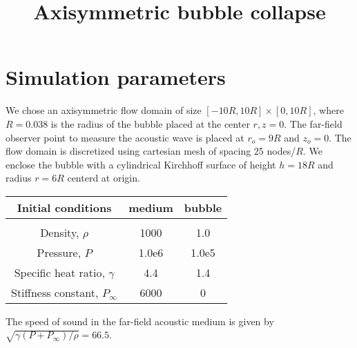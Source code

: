 \documentclass[a4paper]{article}
\title{Axisymmetric bubble collapse}
\date{}
\begin{document}
\maketitle
\section*{Simulation parameters}
We chose an axisymmetric flow domain of size $[-10R, 10R]\times[0, 10R]$, where $R = 0.038$ is the radius of the bubble placed at the center $r,z = 0$. The far-field observer point to measure the acoustic wave is placed at $r_o = 9R$ and $z_o = 0$. The flow domain is discretized using cartesian mesh of spacing $25$ nodes/$R$. We enclose the bubble with a cylindrical Kirchhoff surface of height $h = 18R$ and radius $r = 6R$ centerd at origin.
\begin{table}[h!]
    \begin{center}
        \begin{tabular}{ccc}
            \hline
            Initial conditions      & medium   & bubble     \\
            \hline
                                          &         &         \\
            Density, $\rho$  & 1000    & 1.0     \\
            Pressure, $P$            & 1.0e6  & 1.0e5  \\
            Specific heat ratio, $\gamma$ & 4.4     & 1.4     \\
            Stiffness constant, $P_{\infty}$ & 6000 & 0 \\
            \hline
        \end{tabular}
    \end{center}
\end{table}
The speed of sound in the far-field acoustic medium is given by $\sqrt{\gamma(P + P_{\infty})/\rho} = 66.5$. 


\printbibliography
\end{document}
